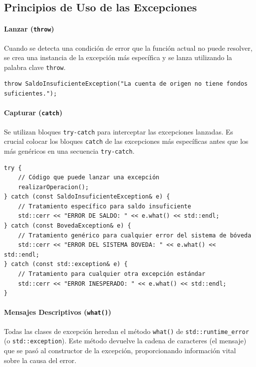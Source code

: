 \documentclass{article}
\newcommand{\inlinecode}[1]{\texttt{#1}}
\begin{document}
\subsection*{Principios de Uso de las Excepciones}

\paragraph*{\textbf{Lanzar (\inlinecode{throw})}}
Cuando se detecta una condici\'on de error que la funci\'on actual no puede resolver, se crea una instancia de la excepci\'on m\'as espec\'ifica y se lanza utilizando la palabra clave \inlinecode{throw}.
\begin{lstlisting}
throw SaldoInsuficienteException("La cuenta de origen no tiene fondos suficientes.");
\end{lstlisting}

\paragraph*{\textbf{Capturar (\inlinecode{catch})}}
Se utilizan bloques \inlinecode{try-catch} para interceptar las excepciones lanzadas. Es crucial colocar los bloques \inlinecode{catch} de las excepciones m\'as espec\'ificas antes que los m\'as gen\'ericos en una secuencia \inlinecode{try-catch}.
\begin{lstlisting}
try {
    // Código que puede lanzar una excepción
    realizarOperacion();
} catch (const SaldoInsuficienteException& e) {
    // Tratamiento específico para saldo insuficiente
    std::cerr << "ERROR DE SALDO: " << e.what() << std::endl;
} catch (const BovedaException& e) {
    // Tratamiento genérico para cualquier error del sistema de bóveda
    std::cerr << "ERROR DEL SISTEMA BOVEDA: " << e.what() << std::endl;
} catch (const std::exception& e) {
    // Tratamiento para cualquier otra excepción estándar
    std::cerr << "ERROR INESPERADO: " << e.what() << std::endl;
}
\end{lstlisting}

\paragraph*{\textbf{Mensajes Descriptivos (\inlinecode{what()})}}
Todas las clases de excepci\'on heredan el m\'etodo \inlinecode{what()} de \inlinecode{std::runtime_error} (o \inlinecode{std::exception}). Este m\'etodo devuelve la cadena de caracteres (el mensaje) que se pas\'o al constructor de la excepci\'on, proporcionando informaci\'on vital sobre la causa del error.
\end{document}
